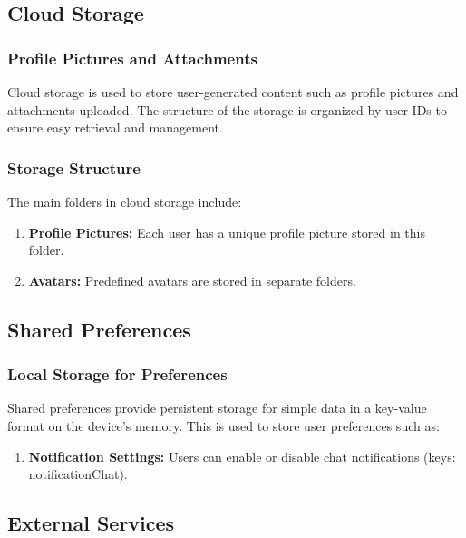 \subsection{Cloud Storage}

\subsubsection{Profile Pictures and Attachments}

Cloud storage is used to store user-generated content such as profile pictures and attachments uploaded. The structure of the storage is organized by user IDs to ensure easy retrieval and management.

\subsubsection{Storage Structure}

The main folders in cloud storage include:

\begin{enumerate}
\item \textbf{Profile Pictures:} Each user has a unique profile picture stored in this folder.
\item \textbf{Avatars:} Predefined avatars are stored in separate folders.
\end{enumerate}

\subsection{Shared Preferences}

\subsubsection{Local Storage for Preferences}

Shared preferences provide persistent storage for simple data in a key-value format on the device's memory. This is used to store user preferences such as:

\begin{enumerate}
\item \textbf{Notification Settings:} Users can enable or disable chat notifications (keys: notificationChat).
\end{enumerate}

\subsection{External Services}

